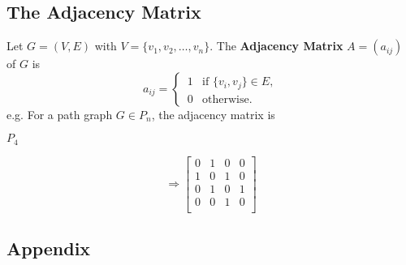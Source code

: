 \documentclass[11pt]{article}
\begin{document}
\subsection{The Adjacency Matrix}
Let $G = (V,E)$ with $V = \{v_1, v_2, \dots, v_n\}$. The \textbf{Adjacency Matrix} $A=(a_{ij})$ of $G$ is
\[
    a_{ij} = 
    \begin{cases}
        \displaystyle
        \,1 & \text{if } \{v_i,v_j\}\in E,\\
        \displaystyle
        \,0 & \text{otherwise}.
    \end{cases}
\]
e.g. For a path graph $G \in P_n$, the adjacency matrix is 
\newline
\begin{minipage}{\textwidth}
    \centering
    \begin{minipage}[][70pt][c]{.3\textwidth}
        $P_4\,$ 
        \centering
    \end{minipage}
    \begin{minipage}[m][70pt][c]{.2\textwidth}
    \vfill
    \[
        \Rightarrow
        \begin{bmatrix}
            0 & 1 & 0 & 0\\
            1 & 0 & 1 & 0\\
            0 & 1 & 0 & 1\\
            0 & 0 & 1 & 0\\
        \end{bmatrix}
    \]
    \vfill
    \end{minipage}
\end{minipage}
\subsection{Appendix}
\end{document}
